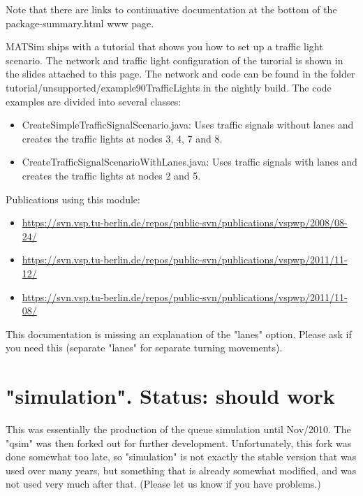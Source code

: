 Note that there are links to continuative documentation at the bottom of the package-summary.html www page.

MATSim ships with a tutorial that shows you how to set up a traffic  light scenario. The network and traffic light configuration of the  turorial is shown in the slides attached to this page. The network and  code can be found in the folder  tutorial/unsupported/example90TrafficLights in the nightly build. The  code examples are divided into several classes:
\begin{itemize}
	\item CreateSimpleTrafficSignalScenario.java: Uses traffic signals  without lanes and creates the traffic lights at nodes 3, 4, 7 and 8.
	\item CreateTrafficSignalScenarioWithLanes.java: Uses traffic signals with lanes and creates the traffic lights at nodes 2 and 5.
\end{itemize}



Publications using this module:
\begin{itemize}
	\item \href{https://svn.vsp.tu-berlin.de/repos/public-svn/publications/vspwp/2008/08-24/}{https://svn.vsp.tu-berlin.de/repos/public-svn/publications/vspwp/2008/08-24/}
	\item \href{https://svn.vsp.tu-berlin.de/repos/public-svn/publications/vspwp/2011/11-12/}{https://svn.vsp.tu-berlin.de/repos/public-svn/publications/vspwp/2011/11-12/}
	\item \href{https://svn.vsp.tu-berlin.de/repos/public-svn/publications/vspwp/2011/11-08/}{https://svn.vsp.tu-berlin.de/repos/public-svn/publications/vspwp/2011/11-08/}
\end{itemize}This documentation is missing an  explanation of the "lanes" option. Please ask if you need this  (separate "lanes" for separate turning movements).




\vfill\eject
\section{"simulation". Status: should work}

This  was essentially the production of the queue simulation until Nov/2010.  The "qsim" was then forked out for further development. Unfortunately,  this fork was done somewhat too late, so "simulation" is not exactly the  stable version that was used over many years, but something that is  already somewhat modified, and was not used very much after that.  (Please let us know if you have problems.)

